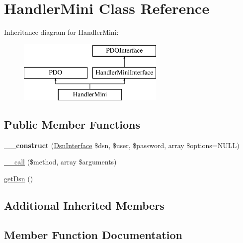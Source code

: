 \hypertarget{class_pes_1_1_database_1_1_handler_1_1_mini_1_1_handler_mini}{}\section{Handler\+Mini Class Reference}
\label{class_pes_1_1_database_1_1_handler_1_1_mini_1_1_handler_mini}
Inheritance diagram for Handler\+Mini\+:\begin{figure}[H]
\begin{center}
\leavevmode
\includegraphics[height=3.000000cm]{class_pes_1_1_database_1_1_handler_1_1_mini_1_1_handler_mini}
\end{center}
\end{figure}
\subsection*{Public Member Functions}
\begin{DoxyCompactItemize}
\item 
\mbox{\label{class_pes_1_1_database_1_1_handler_1_1_mini_1_1_handler_mini_a19fde4fbb23c1bbcb84089869d23b11e}} 
{\bfseries \+\_\+\+\_\+construct} (\mbox{\hyperlink{interface_pes_1_1_database_1_1_handler_1_1_mini_1_1_dsn_interface}{Dsn\+Interface}} \$dsn, \$user, \$password, array \$options=N\+U\+LL)
\item 
\mbox{\hyperlink{class_pes_1_1_database_1_1_handler_1_1_mini_1_1_handler_mini_a599363f7b0d3cfdcf817e8e0bcea9ce1}{\+\_\+\+\_\+call}} (\$method, array \$arguments)
\item 
\mbox{\hyperlink{class_pes_1_1_database_1_1_handler_1_1_mini_1_1_handler_mini_a4a0bf8061a4ee59b487f17625cb37e13}{get\+Dsn}} ()
\end{DoxyCompactItemize}
\subsection*{Additional Inherited Members}


\subsection{Member Function Documentation}
\mbox{\label{class_pes_1_1_database_1_1_handler_1_1_mini_1_1_handler_mini_a599363f7b0d3cfdcf817e8e0bcea9ce1}} 
